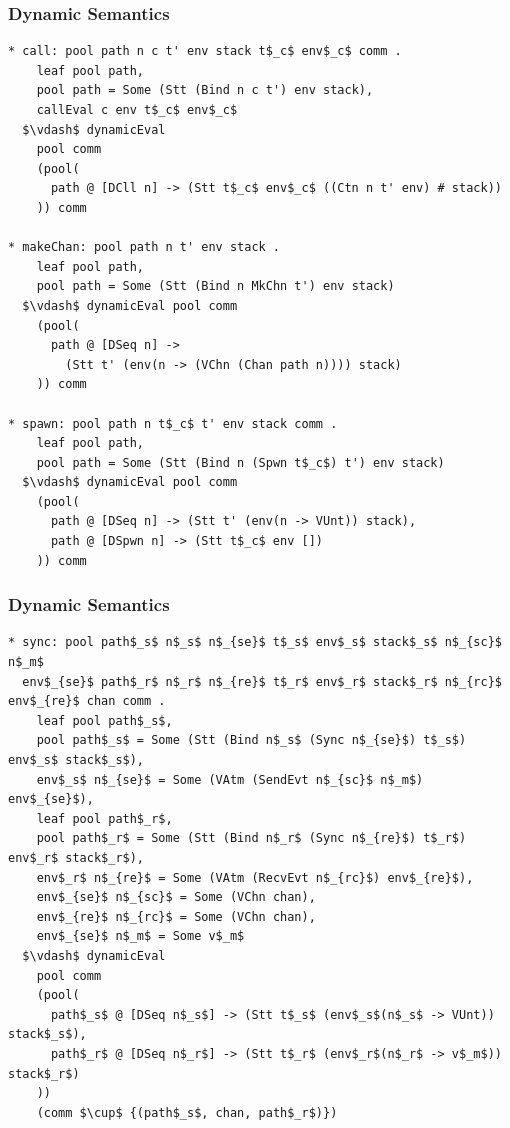 \documentclass{beamer}
\begin{document}
\begin{frame}[fragile]
	\frametitle{Dynamic Semantics}
\begin{lstlisting}[language=logic, mathescape]
* call: pool path n c t' env stack t$_c$ env$_c$ comm .
    leaf pool path,
    pool path = Some (Stt (Bind n c t') env stack),
    callEval c env t$_c$ env$_c$
  $\vdash$ dynamicEval
    pool comm
    (pool(
      path @ [DCll n] -> (Stt t$_c$ env$_c$ ((Ctn n t' env) # stack))
    )) comm

* makeChan: pool path n t' env stack .
    leaf pool path,
    pool path = Some (Stt (Bind n MkChn t') env stack)
  $\vdash$ dynamicEval pool comm 
    (pool(
      path @ [DSeq n] ->
        (Stt t' (env(n -> (VChn (Chan path n)))) stack)
    )) comm

* spawn: pool path n t$_c$ t' env stack comm .
    leaf pool path, 
    pool path = Some (Stt (Bind n (Spwn t$_c$) t') env stack)
  $\vdash$ dynamicEval pool comm 
    (pool(
      path @ [DSeq n] -> (Stt t' (env(n -> VUnt)) stack),
      path @ [DSpwn n] -> (Stt t$_c$ env [])
    )) comm
\end{lstlisting}
\end{frame}

\begin{frame}[fragile]
	\frametitle{Dynamic Semantics}
\begin{lstlisting}[language=logic, mathescape]
* sync: pool path$_s$ n$_s$ n$_{se}$ t$_s$ env$_s$ stack$_s$ n$_{sc}$ n$_m$
  env$_{se}$ path$_r$ n$_r$ n$_{re}$ t$_r$ env$_r$ stack$_r$ n$_{rc}$ env$_{re}$ chan comm .
    leaf pool path$_s$,
    pool path$_s$ = Some (Stt (Bind n$_s$ (Sync n$_{se}$) t$_s$) env$_s$ stack$_s$),
    env$_s$ n$_{se}$ = Some (VAtm (SendEvt n$_{sc}$ n$_m$) env$_{se}$),
    leaf pool path$_r$,
    pool path$_r$ = Some (Stt (Bind n$_r$ (Sync n$_{re}$) t$_r$) env$_r$ stack$_r$),
    env$_r$ n$_{re}$ = Some (VAtm (RecvEvt n$_{rc}$) env$_{re}$),
    env$_{se}$ n$_{sc}$ = Some (VChn chan),
    env$_{re}$ n$_{rc}$ = Some (VChn chan), 
    env$_{se}$ n$_m$ = Some v$_m$
  $\vdash$ dynamicEval
    pool comm
    (pool(
      path$_s$ @ [DSeq n$_s$] -> (Stt t$_s$ (env$_s$(n$_s$ -> VUnt)) stack$_s$), 
      path$_r$ @ [DSeq n$_r$] -> (Stt t$_r$ (env$_r$(n$_r$ -> v$_m$)) stack$_r$)
    )) 
    (comm $\cup$ {(path$_s$, chan, path$_r$)})
\end{lstlisting}
\end{frame}
\end{document}
